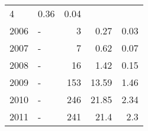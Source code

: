 \begin{longtable}{lXrrr}
       \num{4} &
       \num[round-mode=places,round-precision=2]{0.36} &
         \num[round-mode=places,round-precision=2]{0.04} \\

     2006 &
     \multicolumn{1}{X}{ -  } &


       \num{3} &
       \num[round-mode=places,round-precision=2]{0.27} &
         \num[round-mode=places,round-precision=2]{0.03} \\

     2007 &
     \multicolumn{1}{X}{ -  } &


       \num{7} &
       \num[round-mode=places,round-precision=2]{0.62} &
         \num[round-mode=places,round-precision=2]{0.07} \\

     2008 &
     \multicolumn{1}{X}{ -  } &


       \num{16} &
       \num[round-mode=places,round-precision=2]{1.42} &
         \num[round-mode=places,round-precision=2]{0.15} \\

     2009 &
     \multicolumn{1}{X}{ -  } &


       \num{153} &
       \num[round-mode=places,round-precision=2]{13.59} &
         \num[round-mode=places,round-precision=2]{1.46} \\

     2010 &
     \multicolumn{1}{X}{ -  } &


       \num{246} &
       \num[round-mode=places,round-precision=2]{21.85} &
         \num[round-mode=places,round-precision=2]{2.34} \\

     2011 &
     \multicolumn{1}{X}{ -  } &


       \num{241} &
       \num[round-mode=places,round-precision=2]{21.4} &
         \num[round-mode=places,round-precision=2]{2.3} \\


\end{longtable}
